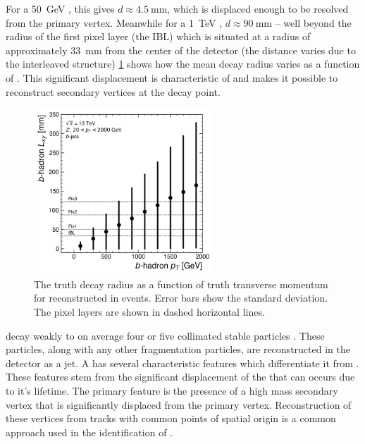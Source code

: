 For a \SI{50}{\GeV} \bhadron, this gives $d \approx \SI{4.5}{\milli\meter}$, which is displaced enough to be resolved from the primary vertex.
Meanwhile for a \SI{1}{\TeV} \bhadron, $d \approx \SI{90}{\milli\meter}$ -- well beyond the radius of the first pixel layer (the IBL) which is situated at a radius of approximately \SI{33}{\milli\meter} from the center of the detector (the distance varies due to the interleaved structure) 
\cref{fig:b_lxy_vs_pt} shows how the mean decay radius varies as a function of \bhadron \pt.
This significant displacement is characteristic of \bjets and makes it possible to reconstruct secondary vertices at the \bhadron decay point.

\begin{figure}[!htbp]
  \centering
  \includegraphics[width=0.6\textwidth]{chapters/3.tracking/figs/b_pt_lxy.pdf}
  \caption{
    The truth \bhadron decay radius \Lxy as a function of truth transverse momentum \pt for reconstructed \bjets in \Zprime events.
    Error bars show the standard deviation.
    The pixel layers are shown in dashed horizontal lines.
  }
  \label{fig:b_lxy_vs_pt}
\end{figure}

\bhadrons decay weakly to on average four or five collimated stable particles \cite{ATL-PHYS-PUB-2014-008}.
These particles, along with any other fragmentation particles, are reconstructed in the detector as a jet.
A \bjet has several characteristic features which differentiate it from \ljets.
These features stem from the significant displacement of the \bhadron that can occurs due to it's lifetime.
The primary feature is the presence of a high mass secondary vertex that is significantly displaced from the primary vertex.
Reconstruction of these vertices from tracks with common points of spatial origin is a common approach used in the identification of \bjets.


